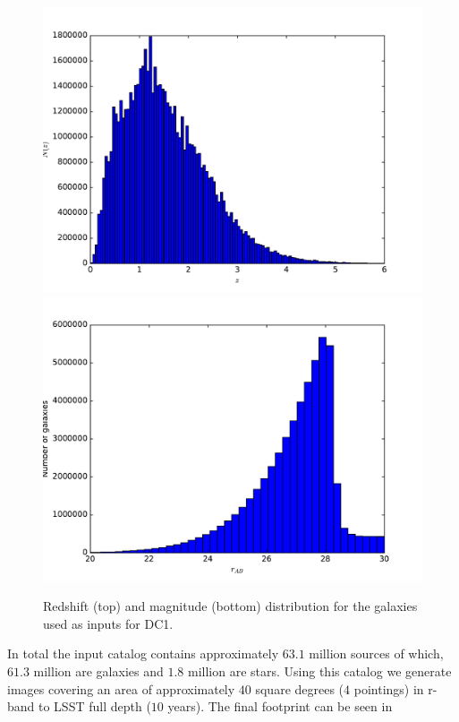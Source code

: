 \documentclass[\docopts]{\docclass}
\begin{document}
\begin{figure}
\centering
\includegraphics[width=0.9\columnwidth]{n_z_galaxies.pdf}
\includegraphics[width=0.9\columnwidth]{n_m_galaxies.pdf}
\caption{Redshift (top) and magnitude (bottom) distribution for the galaxies used as inputs for DC1.}
\label{fig:catalog_plots}
\end{figure}

In total the input catalog contains approximately $63.1$ million sources of which, $61.3$ million are galaxies and $1.8$ million are stars. Using this catalog we generate images covering an area of approximately $40$ square degrees ($4$ pointings) in r-band to LSST full depth ($10$ years). The final footprint can be seen in 
\end{document}

